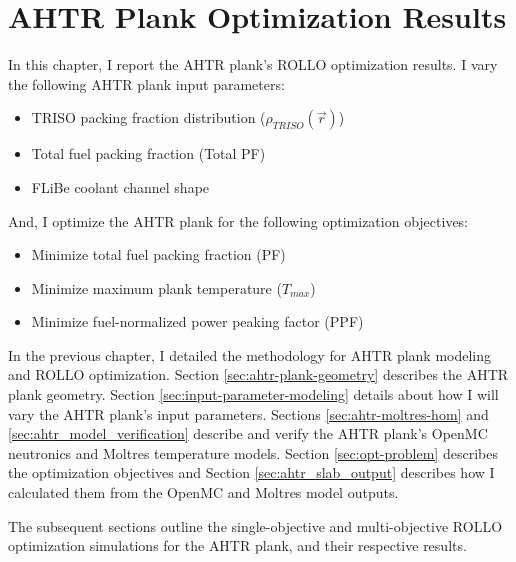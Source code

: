 \chapter{AHTR Plank Optimization Results}
\glsresetall
\label{chap:ahtr-plank-opt-results}
In this chapter, I report the \gls{AHTR} plank's \gls{ROLLO} optimization results. 
I vary the following \gls{AHTR} plank input parameters:
\begin{itemize}
    \item \gls{TRISO} packing fraction distribution ($\rho_{TRISO}(\vec{r})$)
    \item Total fuel packing fraction (Total PF)
    \item \gls{FLiBe} coolant channel shape
\end{itemize} 
And, I optimize the \gls{AHTR} plank for the following optimization objectives:
\begin{itemize}
    \item Minimize total fuel packing fraction (PF)
    \item Minimize maximum plank temperature ($T_{max}$)
    \item Minimize fuel-normalized power peaking factor (PPF)
\end{itemize} 

In the previous chapter, I detailed the methodology for \gls{AHTR} plank modeling and 
\gls{ROLLO} optimization. 
Section \ref{sec:ahtr-plank-geometry} describes the \gls{AHTR} plank geometry.
Section \ref{sec:input-parameter-modeling} details about how I will vary the 
\gls{AHTR} plank's input parameters. 
Sections \ref{sec:ahtr-moltres-hom} and \ref{sec:ahtr_model_verification}
describe and verify the \gls{AHTR} plank's OpenMC neutronics and Moltres 
temperature models. 
Section \ref{sec:opt-problem} describes the optimization objectives and Section 
\ref{sec:ahtr_slab_output} describes how I calculated them from the OpenMC and Moltres 
model outputs. 

The subsequent sections outline the single-objective and multi-objective 
ROLLO optimization simulations for the \gls{AHTR} plank, and their respective results. 

